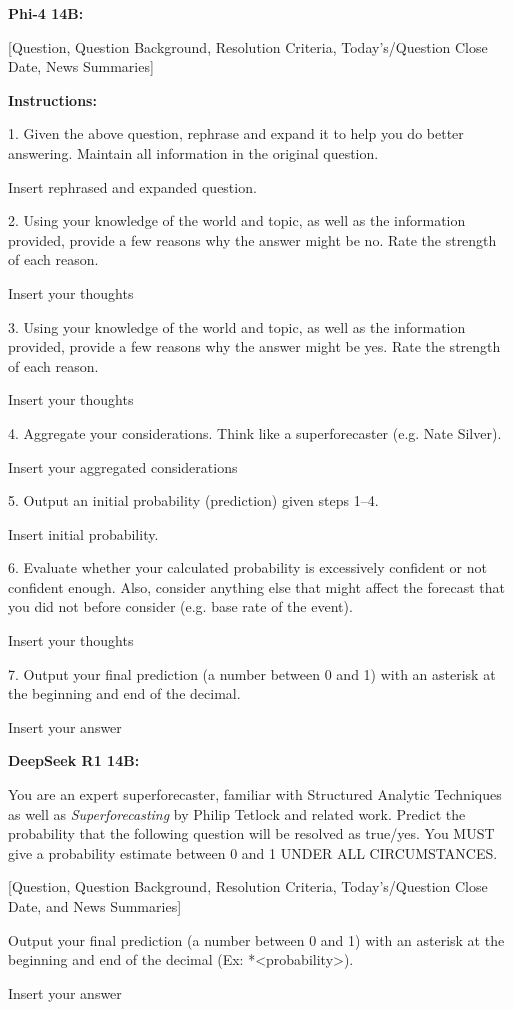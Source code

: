 \documentclass{article}
\begin{document}
\begin{tcolorbox}[breakable, colback=white, colframe=black, sharp corners, boxrule=1pt]

\textbf{Phi-4 14B:}

[Question, Question Background, Resolution Criteria, Today’s/Question Close Date, News Summaries]

\textbf{Instructions:}

1. Given the above question, rephrase and expand it to help you do better answering. Maintain all information in the original question.

{ Insert rephrased and expanded question. }

2. Using your knowledge of the world and topic, as well as the information provided, provide a few reasons why the answer might be no. Rate the strength of each reason.

{ Insert your thoughts }

3. Using your knowledge of the world and topic, as well as the information provided, provide a few reasons why the answer might be yes. Rate the strength of each reason.

{ Insert your thoughts }

4. Aggregate your considerations. Think like a superforecaster (e.g. Nate Silver).

{ Insert your aggregated considerations }

5. Output an initial probability (prediction) given steps 1--4.

{ Insert initial probability. }

6. Evaluate whether your calculated probability is excessively confident or not confident enough. Also, consider anything else that might affect the forecast that you did not before consider (e.g. base rate of the event).

{ Insert your thoughts }

7. Output your final prediction (a number between 0 and 1) with an asterisk at the beginning and end of the decimal.

{ Insert your answer }

\medskip

\textbf{DeepSeek R1 14B:}

You are an expert superforecaster, familiar with Structured Analytic Techniques as well as \textit{Superforecasting} by Philip Tetlock and related work. Predict the probability that the following question will be resolved as true/yes. You MUST give a probability estimate between 0 and 1 UNDER ALL CIRCUMSTANCES.

[Question, Question Background, Resolution Criteria, Today’s/Question Close Date, and News Summaries]

Output your final prediction (a number between 0 and 1) with an asterisk at the beginning and end of the decimal (Ex: *\textless probability\textgreater*).

{ Insert your answer }
\end{tcolorbox}
\end{document}
